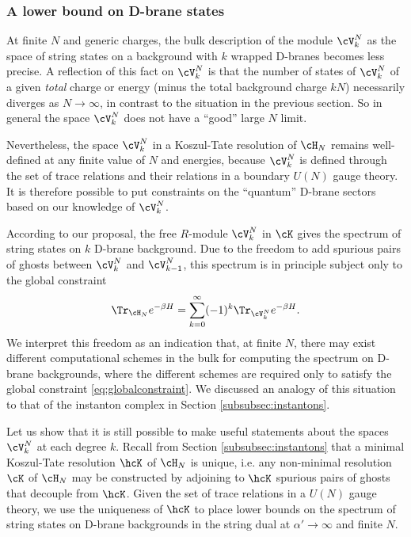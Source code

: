 \documentclass[a4paper,12pt]{article}
\begin{document}
\subsubsection{A lower bound on D-brane states} \label{subsubsec:lowerbound}

At finite $N$ and generic charges, the bulk description of the module $\cV_k^N$ as the space of string states on a background with $k$ wrapped D-branes becomes less precise. A reflection of this fact on $\cV_k^N$ is that the number of states of $\cV_k^N$ of a given \textit{total} charge or energy (minus the total background charge $k N$) necessarily diverges as $N \to \infty$, in contrast to the situation in the previous section. So in general the space $\cV_k^N$ does not have a ``good'' large $N$ limit.

Nevertheless, the space $\cV_k^N$ in a Koszul-Tate resolution of $\cH_N$ remains well-defined at any finite value of $N$ and energies, because $\cV_k^N$ is defined through the set of trace relations and their relations in a boundary $U(N)$ gauge theory. It is therefore possible to put constraints on the ``quantum'' D-brane sectors based on our knowledge of $\cV_k^N$.

According to our proposal, the free $R$-module $\cV_k^N$ in $\cK$ gives the spectrum of string states on $k$ D-brane background. Due to the freedom to add spurious pairs of ghosts between $\cV_k^N$ and $\cV_{k-1}^N$, this spectrum is in principle subject only to the global constraint
\begin{equation} \label{eq:globalconstraint}
\Tr_{\cH_N} e^{-\beta H} = \sum_{k=0}^\infty (-1)^k \Tr_{\cV_k^N} e^{-\beta H}.
\end{equation}
We interpret this freedom as an indication that, at finite $N$, there may exist different computational schemes in the bulk for computing the spectrum on D-brane backgrounds, where the different schemes are required only to satisfy the global constraint \eqref{eq:globalconstraint}. We discussed an analogy of this situation to that of the instanton complex in Section \ref{subsubsec:instantons}.

Let us show that it is still possible to make useful statements about the spaces $\cV_k^N$ at each degree $k$. Recall from Section \ref{subsubsec:instantons} that a minimal Koszul-Tate resolution $\hcK$ of $\cH_N$ is unique, i.e. any non-minimal resolution $\cK$ of $\cH_N$ may be constructed by adjoining to $\hcK$ spurious pairs of ghosts that decouple from $\hcK$. Given the set of trace relations in a $U(N)$ gauge theory, we use the uniqueness of $\hcK$ to place lower bounds on the spectrum of string states on D-brane backgrounds in the string dual at $\alpha' \to \infty$ and finite $N$.
\end{document}
